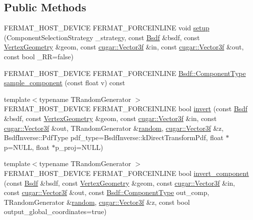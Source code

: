 \subsection*{Public Methods}
\begin{DoxyCompactItemize}
\item 
F\+E\+R\+M\+A\+T\+\_\+\+H\+O\+S\+T\+\_\+\+D\+E\+V\+I\+CE F\+E\+R\+M\+A\+T\+\_\+\+F\+O\+R\+C\+E\+I\+N\+L\+I\+NE void \hyperlink{group___path_module_gaecfd88fd5ceeaef4df9d86387855e78c}{setup} (Component\+Selection\+Strategy \+\_\+strategy, const \hyperlink{struct_bsdf}{Bsdf} \&bsdf, const \hyperlink{struct_vertex_geometry}{Vertex\+Geometry} \&geom, const \hyperlink{structcugar_1_1_vector}{cugar\+::\+Vector3f} \&in, const \hyperlink{structcugar_1_1_vector}{cugar\+::\+Vector3f} \&out, const bool \+\_\+\+RR=false)
\item 
F\+E\+R\+M\+A\+T\+\_\+\+H\+O\+S\+T\+\_\+\+D\+E\+V\+I\+CE F\+E\+R\+M\+A\+T\+\_\+\+F\+O\+R\+C\+E\+I\+N\+L\+I\+NE \hyperlink{struct_bsdf_a5f7db6f81220ed9ee6da109d6eb5b585}{Bsdf\+::\+Component\+Type} \hyperlink{group___path_module_gab7b0d8544e315f99452e7798fe812be4}{sample\+\_\+component} (const float v) const
\item 
{\footnotesize template$<$typename T\+Random\+Generator $>$ }\\F\+E\+R\+M\+A\+T\+\_\+\+H\+O\+S\+T\+\_\+\+D\+E\+V\+I\+CE F\+E\+R\+M\+A\+T\+\_\+\+F\+O\+R\+C\+E\+I\+N\+L\+I\+NE bool \hyperlink{group___path_module_gabf86c201c8bc8e874d935f3eeae66269}{invert} (const \hyperlink{struct_bsdf}{Bsdf} \&bsdf, const \hyperlink{struct_vertex_geometry}{Vertex\+Geometry} \&geom, const \hyperlink{structcugar_1_1_vector}{cugar\+::\+Vector3f} \&in, const \hyperlink{structcugar_1_1_vector}{cugar\+::\+Vector3f} \&out, T\+Random\+Generator \&\hyperlink{group___sampling_module_gaec17bbbfd36295353081b7b4480d933d}{random}, \hyperlink{structcugar_1_1_vector}{cugar\+::\+Vector3f} \&z, Bsdf\+Inverse\+::\+Pdf\+Type pdf\+\_\+type=Bsdf\+Inverse\+::k\+Direct\+Transform\+Pdf, float $\ast$p=N\+U\+LL, float $\ast$p\+\_\+proj=N\+U\+LL)
\item 
{\footnotesize template$<$typename T\+Random\+Generator $>$ }\\F\+E\+R\+M\+A\+T\+\_\+\+H\+O\+S\+T\+\_\+\+D\+E\+V\+I\+CE F\+E\+R\+M\+A\+T\+\_\+\+F\+O\+R\+C\+E\+I\+N\+L\+I\+NE bool \hyperlink{group___path_module_gae150d5775f0c5c69fc21b8ab50680db6}{invert\+\_\+component} (const \hyperlink{struct_bsdf}{Bsdf} \&bsdf, const \hyperlink{struct_vertex_geometry}{Vertex\+Geometry} \&geom, const \hyperlink{structcugar_1_1_vector}{cugar\+::\+Vector3f} \&in, const \hyperlink{structcugar_1_1_vector}{cugar\+::\+Vector3f} \&out, const \hyperlink{struct_bsdf_a5f7db6f81220ed9ee6da109d6eb5b585}{Bsdf\+::\+Component\+Type} out\+\_\+comp, T\+Random\+Generator \&\hyperlink{group___sampling_module_gaec17bbbfd36295353081b7b4480d933d}{random}, \hyperlink{structcugar_1_1_vector}{cugar\+::\+Vector3f} \&z, const bool output\+\_\+global\+\_\+coordinates=true)

\end{DoxyCompactItemize}
